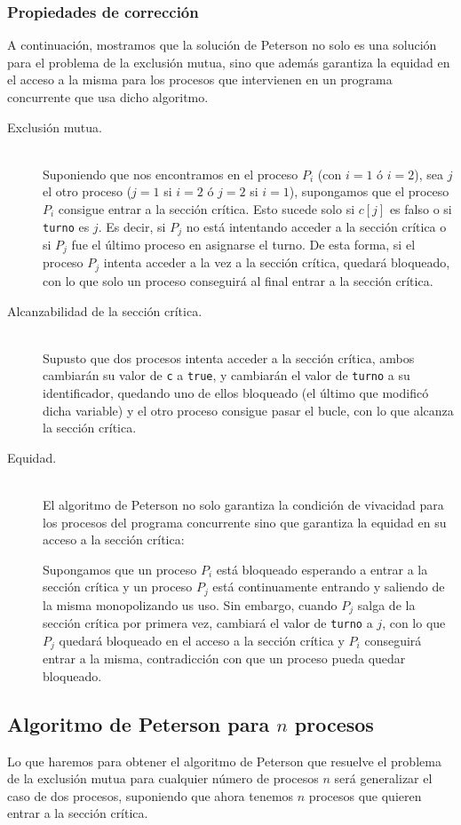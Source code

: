 \subsubsection{Propiedades de corrección}
A continuación, mostramos que la solución de Peterson no solo es una solución para el problema de la exclusión mutua, sino que además garantiza la equidad en el acceso a la misma para los procesos que intervienen en un programa concurrente que usa dicho algoritmo.
\begin{description}
    \item [Exclusión mutua.]~\\
        Suponiendo que nos encontramos en el proceso $P_i$ (con $i=1$ ó $i=2$), sea $j$ el otro proceso ($j =1$ si $i=2$ ó $j=2$ si $i=1$), supongamos que el proceso $P_i$ consigue entrar a la sección crítica. Esto sucede solo si $c[j]$ es falso o si \verb|turno| es $j$. Es decir, si $P_j$ no está intentando acceder a la sección crítica o si $P_j$ fue el último proceso en asignarse el turno. De esta forma, si el proceso $P_j$ intenta acceder a la vez a la sección crítica, quedará bloqueado, con lo que solo un proceso conseguirá al final entrar a la sección crítica.
    \item [Alcanzabilidad de la sección crítica.]~\\
        Supusto que dos procesos intenta acceder a la sección crítica, ambos cambiarán su valor de \verb|c| a \verb|true|, y cambiarán el valor de \verb|turno| a su identificador, quedando uno de ellos bloqueado (el último que modificó dicha variable) y el otro proceso consigue pasar el bucle, con lo que alcanza la sección crítica.
    \item [Equidad.]~\\
        El algoritmo de Peterson no solo garantiza la condición de vivacidad para los procesos del programa concurrente sino que garantiza la equidad en su acceso a la sección crítica:

        Supongamos que un proceso $P_i$ está bloqueado esperando a entrar a la sección crítica y un proceso $P_j$ está continuamente entrando y saliendo de la misma monopolizando us uso. Sin embargo, cuando $P_j$ salga de la sección crítica por primera vez, cambiará el valor de \verb|turno| a $j$, con lo que $P_j$ quedará bloqueado en el acceso a la sección crítica y $P_i$ conseguirá entrar a la misma, contradicción con que un proceso pueda quedar bloqueado.
\end{description}

\subsection{Algoritmo de Peterson para $n$ procesos}
Lo que haremos para obtener el algoritmo de Peterson que resuelve el problema de la exclusión mutua para cualquier número de procesos $n$ será generalizar el caso de dos procesos, suponiendo que ahora tenemos $n$ procesos que quieren entrar a la sección crítica.

